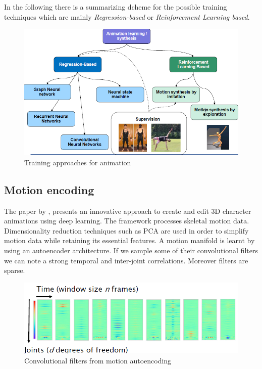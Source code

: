 In the following there is a summarizing dcheme for the possible training techniques which are mainly \textit{Regression-based} or \textit{Reinforcement Learning based}.

\begin{figure}
    \centering
    \includegraphics[scale=0.8]{img/MotionRecap.png}
    \caption{Training approaches for animation}
\end{figure}

\subsection{Motion encoding}
The paper by \citeauthor{holden2016deep}, \cite{holden2016deep} presents an innovative approach to create and edit 3D character animations using deep learning. The framework processes skeletal motion data. Dimensionality reduction techniques such as PCA are used in order to simplify motion data while retaining its essential features. A motion manifold is learnt by using an autoencoder architecture. If we sample some of their convolutional filters  we can note a strong temporal and inter-joint correlations. Moreover filters are sparse.

\begin{figure}
    \centering
    \includegraphics[scale=0.6]{img/MotionAutoenc.png}
    \caption{Convolutional filters from motion autoencoding}
\end{figure}

